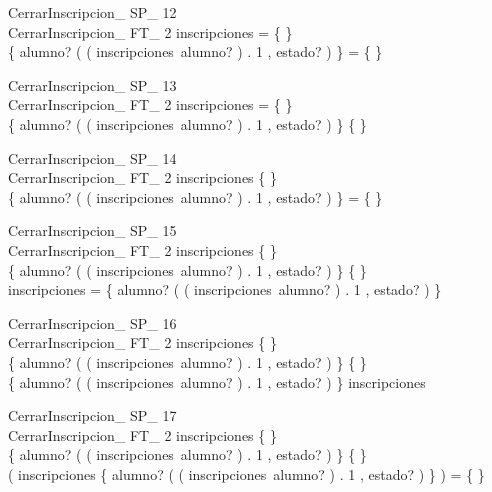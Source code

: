 \documentclass{article}
\begin{document}
 
 \begin{schema}{CerrarInscripcion\_ SP\_ 12}\\
  CerrarInscripcion\_ FT\_ 2 
 \where
  inscripciones = \{ \} \\
  \{ alumno? \mapsto ( ( inscripciones~alumno? ) . 1 , estado? ) \} = \{ \}
 \end{schema}
 
 
 \begin{schema}{CerrarInscripcion\_ SP\_ 13}\\
  CerrarInscripcion\_ FT\_ 2 
 \where
  inscripciones = \{ \} \\
  \{ alumno? \mapsto ( ( inscripciones~alumno? ) . 1 , estado? ) \} \neq \{ \}
 \end{schema}
 
 
 \begin{schema}{CerrarInscripcion\_ SP\_ 14}\\
  CerrarInscripcion\_ FT\_ 2 
 \where
  inscripciones \neq \{ \} \\
  \{ alumno? \mapsto ( ( inscripciones~alumno? ) . 1 , estado? ) \} = \{ \}
 \end{schema}
 
 
 \begin{schema}{CerrarInscripcion\_ SP\_ 15}\\
  CerrarInscripcion\_ FT\_ 2 
 \where
  inscripciones \neq \{ \} \\
  \{ alumno? \mapsto ( ( inscripciones~alumno? ) . 1 , estado? ) \} \neq \{ \} \\
  \dom inscripciones = \dom \{ alumno? \mapsto ( ( inscripciones~alumno? ) . 1 , estado? ) \}
 \end{schema}
 
 
 \begin{schema}{CerrarInscripcion\_ SP\_ 16}\\
  CerrarInscripcion\_ FT\_ 2 
 \where
  inscripciones \neq \{ \} \\
  \{ alumno? \mapsto ( ( inscripciones~alumno? ) . 1 , estado? ) \} \neq \{ \} \\
  \dom \{ alumno? \mapsto ( ( inscripciones~alumno? ) . 1 , estado? ) \} \subset \dom inscripciones
 \end{schema}
 
 
 \begin{schema}{CerrarInscripcion\_ SP\_ 17}\\
  CerrarInscripcion\_ FT\_ 2 
 \where
  inscripciones \neq \{ \} \\
  \{ alumno? \mapsto ( ( inscripciones~alumno? ) . 1 , estado? ) \} \neq \{ \} \\
  ( \dom inscripciones \cap \dom \{ alumno? \mapsto ( ( inscripciones~alumno? ) . 1 , estado? ) \} ) = \{ \}
 \end{schema}
 
\end{document}
